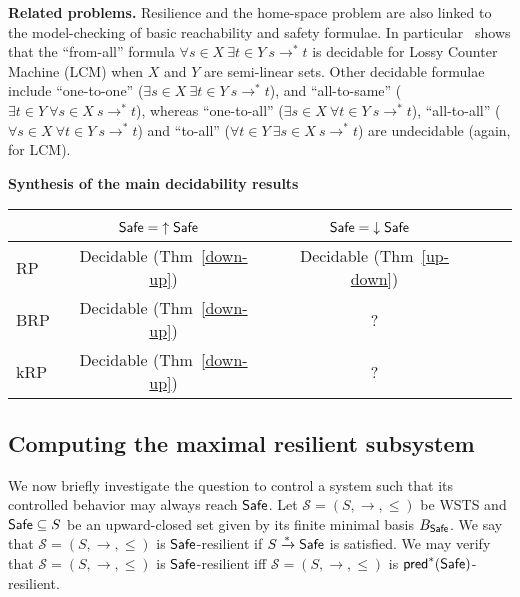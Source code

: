 {\bf Related problems.} 
Resilience and the home-space problem are also linked to the 
model-checking of basic reachability and safety formulae. 
In particular~\cite{DBLP:conf/rp/Schnoebelen10} shows that the ``from-all'' formula $\forall s \in X~ \exists t \in Y~ s \to^* t$
is decidable for Lossy Counter Machine (LCM)
when $X$ and $Y$ are semi-linear sets.
Other decidable formulae include ``one-to-one'' ($\exists s \in  X ~ \exists t \in  Y ~ s \to^* 
 t$), and ``all-to-same'' ($\exists t \in  Y ~ \forall s \in  X ~ s \to^*  t$),
whereas ``one-to-all'' ($\exists s \in  X ~ \forall t \in  Y ~ s \to^*  t$), 
``all-to-all'' ($\forall s \in  X ~ \forall t \in  Y ~ s \to^*  t$)
  and ``to-all'' ($\forall t \in  Y  ~ \exists s \in  X ~ s \to^*  t$) are undecidable (again, for LCM). 
  
  
  





{\bf Synthesis of the main decidability results}\label{synthesis}
\begin{center}
\begin{tabular}{ | l | c | c | c | r |}
\hline   \ %
		& $\textsf{Safe} = {\uparrow \textsf{Safe}}$~ 
		 & $\textsf{Safe} = {\downarrow \textsf{Safe}}$~ 
 \\ \hline
   RP %
   	& Decidable (Thm~\ref{down-up})  
   		 & Decidable (Thm~\ref{up-down}) 
    \\ \hline
   BRP %
   &  Decidable (Thm~\ref{down-up}) 
   		 & ?
    \\ \hline
      kRP %
      & Decidable (Thm~\ref{down-up}) 
      		& ? 
       \\ \hline
 \end{tabular}
\end{center}

\iffalse
\subsection{Computing the maximal resilient subsystem}

We now briefly investigate the question to control a system such that its controlled behavior may always reach $\textsf{Safe}$.
%
Let $\mathscr{S}=(S, \rightarrow, \leq)$ be WSTS and $\textsf{Safe} \subseteq S$ be an upward-closed set given by its finite minimal basis $B_{\textsf{Safe}}$. 
%
We say that $\mathscr{S}=(S, \rightarrow, \leq)$ is $\textsf{Safe}$-resilient if $S  \xrightarrow{*} \textsf{Safe}$ is satisfied.  
%
We may verify that  $\mathscr{S}=(S, \rightarrow, \leq)$ is $\textsf{Safe}$-resilient iff  $\mathscr{S}=(S, \rightarrow, \leq)$ is $\textsf{pred}^*(\textsf{Safe})$-resilient. 

